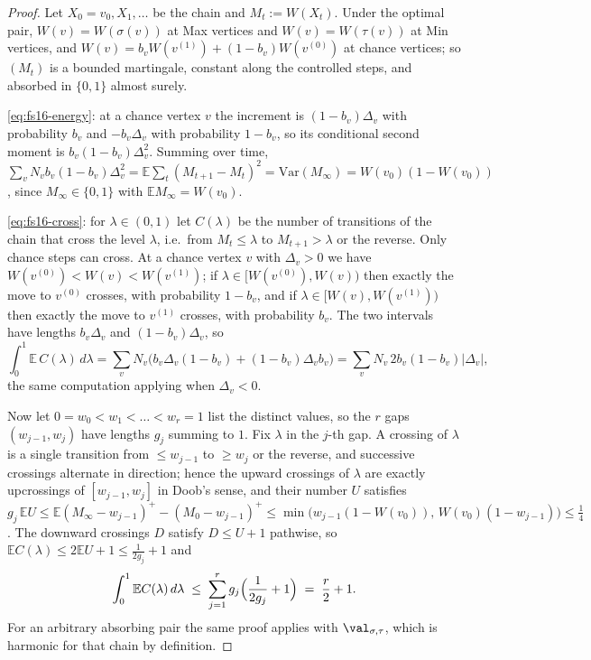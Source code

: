\begin{proof}
Let $X_0=v_0,X_1,\dots$ be the chain and $M_t:=W(X_t)$. Under the optimal pair,
$W(v)=W(\sigma(v))$ at Max vertices and $W(v)=W(\tau(v))$ at Min vertices, and
$W(v)=b_vW(v^{(1)})+(1-b_v)W(v^{(0)})$ at chance vertices; so $(M_t)$ is a
bounded martingale, constant along the controlled steps, and absorbed in
$\{0,1\}$ almost surely.

\eqref{eq:fs16-energy}: at a chance vertex $v$ the increment is $(1-b_v)\Delta_v$
with probability $b_v$ and $-b_v\Delta_v$ with probability $1-b_v$, so its
conditional second moment is $b_v(1-b_v)\Delta_v^{2}$. Summing over time,
$\sum_v N_vb_v(1-b_v)\Delta_v^{2}=\mathbb{E}\sum_t(M_{t+1}-M_t)^2
=\mathrm{Var}(M_\infty)=W(v_0)(1-W(v_0))$, since $M_\infty\in\{0,1\}$ with
$\mathbb{E}M_\infty=W(v_0)$.

\eqref{eq:fs16-cross}: for $\lambda\in(0,1)$ let $C(\lambda)$ be the number of
transitions of the chain that cross the level $\lambda$, i.e.\ from $M_t\le
\lambda$ to $M_{t+1}>\lambda$ or the reverse. Only chance steps can cross. At a
chance vertex $v$ with $\Delta_v>0$ we have
$W(v^{(0)})<W(v)<W(v^{(1)})$; if $\lambda\in[W(v^{(0)}),W(v))$ then exactly the
move to $v^{(0)}$ crosses, with probability $1-b_v$, and if
$\lambda\in[W(v),W(v^{(1)}))$ then exactly the move to $v^{(1)}$ crosses, with
probability $b_v$. The two intervals have lengths $b_v\Delta_v$ and
$(1-b_v)\Delta_v$, so
\[
  \int_0^1\mathbb{E}\,C(\lambda)\,d\lambda
  =\sum_v N_v\bigl(b_v\Delta_v(1-b_v)+(1-b_v)\Delta_v b_v\bigr)
  =\sum_v N_v\,2b_v(1-b_v)|\Delta_v|,
\]
the same computation applying when $\Delta_v<0$.

Now let $0=w_0<w_1<\dots<w_r=1$ list the distinct values, so the $r$ gaps
$(w_{j-1},w_j)$ have lengths $g_j$ summing to $1$. Fix $\lambda$ in the $j$-th
gap. A crossing of $\lambda$ is a single transition from $\le w_{j-1}$ to
$\ge w_j$ or the reverse, and successive crossings alternate in direction;
hence the upward crossings of $\lambda$ are exactly upcrossings of
$[w_{j-1},w_j]$ in Doob's sense, and their number $U$ satisfies
$g_j\,\mathbb{E}U\le\mathbb{E}(M_\infty-w_{j-1})^{+}-(M_0-w_{j-1})^{+}
\le\min\bigl(w_{j-1}(1-W(v_0)),\,W(v_0)(1-w_{j-1})\bigr)\le\tfrac14$.
The downward crossings $D$ satisfy $D\le U+1$ pathwise, so
$\mathbb{E}C(\lambda)\le 2\mathbb{E}U+1\le \tfrac1{2g_j}+1$ and
\[
  \int_0^1\mathbb{E}C(\lambda)\,d\lambda
  \;\le\;\sum_{j=1}^{r} g_j\Bigl(\frac1{2g_j}+1\Bigr)\;=\;\frac r2+1 .
\]
For an arbitrary absorbing pair the same proof applies with $\val_{\sigma,\tau}$,
which is harmonic for that chain by definition.
\end{proof}

